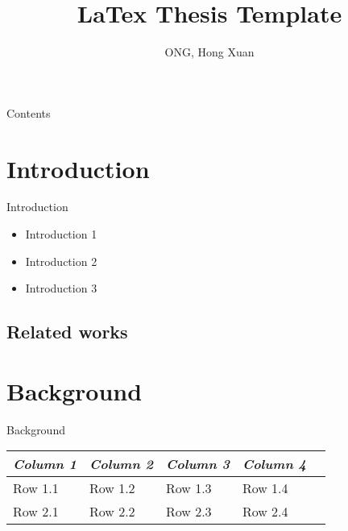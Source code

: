 \documentclass[11pt]{beamer}
\author{ONG, Hong Xuan}
\title{LaTex Thesis Template}
\institute{Japan Advanced Institute of Science And Technology}
\begin{document}
\begin{frame}
\titlepage
\end{frame}

\begin{frame}{Contents}
\tableofcontents
\end{frame}

\section{Introduction}
\begin{frame}{Introduction}
	\begin{itemize}
		\item Introduction 1
		\item Introduction 2
		\item Introduction 3
	\end{itemize}
\end{frame}

\subsection{Related works}

\section{Background}
\begin{frame}{Background}
\begin{center}

  \begin{tabular} {l l l l l}
  \toprule
  \it Column 1 & \it Column 2 & \it Column 3 & \it Column 4 \\
  \midrule

  Row 1.1 & Row 1.2 & Row 1.3 & Row 1.4 \\
  Row 2.1 & Row 2.2 & Row 2.3 & Row 2.4 \\

  \bottomrule
  \end{tabular}

\end{center}
\end{frame}
\end{document}
